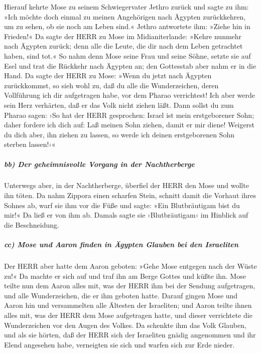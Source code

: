  Hierauf kehrte Mose zu seinem Schwiegervater Jethro
zurück und sagte zu ihm: »Ich möchte doch einmal zu meinen Angehörigen
nach Ägypten zurückkehren, um zu sehen, ob sie noch am Leben sind.«
Jethro antwortete ihm: »Ziehe hin in Frieden!«  Da sagte
der HERR zu Mose im Midianiterlande: »Kehre nunmehr nach Ägypten zurück;
denn alle die Leute, die dir nach dem Leben getrachtet haben, sind tot.«
 So nahm denn Mose seine Frau und seine Söhne, setzte sie
auf Esel und trat die Rückkehr nach Ägypten an; den Gottesstab aber nahm
er in die Hand.  Da sagte der HERR zu Mose: »Wenn du
jetzt nach Ägypten zurückkommst, so sieh wohl zu, daß du alle die
Wunderzeichen, deren Vollführung ich dir aufgetragen habe, vor dem
Pharao verrichtest! Ich aber werde sein Herz verhärten, daß er das Volk
nicht ziehen läßt.  Dann sollst du zum Pharao sagen: ›So
hat der HERR gesprochen: Israel ist mein erstgeborener Sohn;
 daher fordere ich dich auf: Laß meinen Sohn ziehen,
damit er mir diene! Weigerst du dich aber, ihn ziehen zu lassen, so
werde ich deinen erstgeborenen Sohn sterben lassen!‹«

\hypertarget{bb-der-geheimnisvolle-vorgang-in-der-nachtherberge}{%
\subparagraph{bb) Der geheimnisvolle Vorgang in der
Nachtherberge}\label{bb-der-geheimnisvolle-vorgang-in-der-nachtherberge}}

 Unterwegs aber, in der Nachtherberge, überfiel der HERR
den Mose und wollte ihn töten.  Da nahm Zippora einen
scharfen Stein, schnitt damit die Vorhaut ihres Sohnes ab, warf sie ihm
vor die Füße und sagte: »Ein Blutbräutigam bist du mir!« 
Da ließ er von ihm ab. Damals sagte sie ›Blutbräutigam‹ im Hinblick auf
die Beschneidung.

\hypertarget{cc-mose-und-aaron-finden-in-uxe4gypten-glauben-bei-den-israeliten}{%
\subparagraph{cc) Mose und Aaron finden in Ägypten Glauben bei den
Israeliten}\label{cc-mose-und-aaron-finden-in-uxe4gypten-glauben-bei-den-israeliten}}

 Der HERR aber hatte dem Aaron geboten: »Gehe Mose
entgegen nach der Wüste zu!« Da machte er sich auf und traf ihn am Berge
Gottes und küßte ihn.  Mose teilte nun dem Aaron alles
mit, was der HERR ihm bei der Sendung aufgetragen, und alle
Wunderzeichen, die er ihm geboten hatte.  Darauf gingen
Mose und Aaron hin und versammelten alle Ältesten der Israeliten;
 und Aaron teilte ihnen alles mit, was der HERR dem Mose
aufgetragen hatte, und dieser verrichtete die Wunderzeichen vor den
Augen des Volkes.  Da schenkte ihm das Volk Glauben, und
als sie hörten, daß der HERR sich der Israeliten gnädig angenommen und
ihr Elend angesehen habe, verneigten sie sich und warfen sich zur Erde
nieder.


